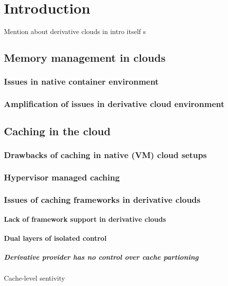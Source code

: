 \chapter{Introduction}
  
  Mention about derivative clouds in intro itself s
  
  \section{Memory management in clouds}
     
    \subsection{Issues in native container environment}	
    \subsection{Amplification of issues in derivative cloud environment}
  
  \section{Caching in the cloud}
  
   \subsection{Drawbacks of caching in native (VM) cloud setups}
  
   \subsection{Hypervisor managed caching}
      
    \subsection{Issues of caching frameworks in derivative clouds}
      \subsubsection{Lack of framework support in derivative clouds}
      \subsubsection{Dual layers of isolated control}	
	 \paragraph{Derivative provider has no control over cache partioning}
	    Cache-level sentivity
